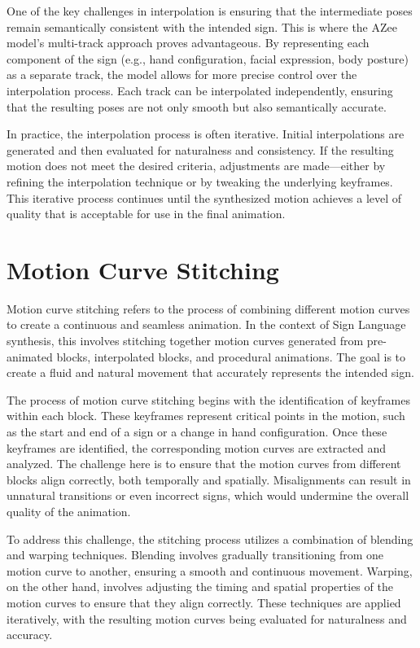 \documentclass[../../main.tex]{subfiles}
\begin{document}
One of the key challenges in interpolation is ensuring that the intermediate poses remain semantically consistent with the intended sign. This is where the AZee model's multi-track approach proves advantageous. By representing each component of the sign (e.g., hand configuration, facial expression, body posture) as a separate track, the model allows for more precise control over the interpolation process. Each track can be interpolated independently, ensuring that the resulting poses are not only smooth but also semantically accurate.

In practice, the interpolation process is often iterative. Initial interpolations are generated and then evaluated for naturalness and consistency. If the resulting motion does not meet the desired criteria, adjustments are made—either by refining the interpolation technique or by tweaking the underlying keyframes. This iterative process continues until the synthesized motion achieves a level of quality that is acceptable for use in the final animation.

\section{Motion Curve Stitching}

Motion curve stitching refers to the process of combining different motion curves to create a continuous and seamless animation. In the context of Sign Language synthesis, this involves stitching together motion curves generated from pre-animated blocks, interpolated blocks, and procedural animations. The goal is to create a fluid and natural movement that accurately represents the intended sign.

The process of motion curve stitching begins with the identification of keyframes within each block. These keyframes represent critical points in the motion, such as the start and end of a sign or a change in hand configuration. Once these keyframes are identified, the corresponding motion curves are extracted and analyzed. The challenge here is to ensure that the motion curves from different blocks align correctly, both temporally and spatially. Misalignments can result in unnatural transitions or even incorrect signs, which would undermine the overall quality of the animation.

To address this challenge, the stitching process utilizes a combination of blending and warping techniques. Blending involves gradually transitioning from one motion curve to another, ensuring a smooth and continuous movement. Warping, on the other hand, involves adjusting the timing and spatial properties of the motion curves to ensure that they align correctly. These techniques are applied iteratively, with the resulting motion curves being evaluated for naturalness and accuracy.
\end{document}
